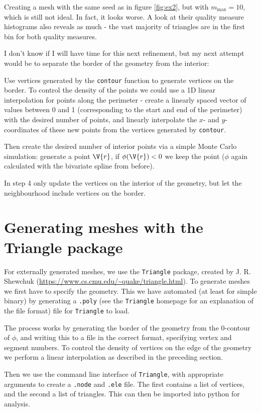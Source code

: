 \documentclass[sigconf]{acmart}
\begin{document}
Creating a mesh with the same seed as in figure \ref{fig:ex2}, but with $ m_{\max} = 10 $, which is still not ideal. In fact, it looks worse. A look at their quality measure histograms also reveals as much - the vast majority of triangles are in the first bin for both quality measures.

I don't know if I will have time for this next refinement, but my next attempt would be to separate the border of the geometry from the interior:

Use vertices generated by the \texttt{contour} function to generate vertices on the border. To control the density of the points we could use a 1D linear interpolation for points along the perimeter - create a linearly spaced vector of values between 0 and 1 (corresponding to the start and end of the perimeter) with the desired number of points, and linearly interpolate the $ x $- and $ y $-coordinates of these new points from the vertices generated by \texttt{contour}.

Then create the desired number of interior points via a simple Monte Carlo simulation: generate a point $ \V{r} $, if $ \phi(\V{r}) < 0 $ we keep the point ($ \phi $ again calculated with the bivariate spline from before).

In step 4 only update the vertices on the interior of the geometry, but let the neighbourhood include vertices on the border.


\section{Generating meshes with the Triangle package}
For externally generated meshes, we use the \texttt{Triangle} package, created by J. R. Shewchuk (\url{https://www.cs.cmu.edu/~quake/triangle.html}). To generate meshes we first have to specify the geometry. This we have automated (at least for simple binary) by generating a \texttt{.poly} (see the \texttt{Triangle} homepage for an explanation of the file format) file for \texttt{Triangle} to load.

The process works by generating the border of the geometry from the 0-contour of $ \phi $, and writing this to a file in the correct format, specifying vertex and segment numbers. To control the density of vertices on the edge of the geometry we perform a linear interpolation as described in the preceding section.

Then we use the command line interface of \texttt{Triangle}, with appropriate arguments to create a \texttt{.node} and \texttt{.ele} file. The first contains a list of vertices, and the second a list of triangles. This can then be imported into python for analysis.
\end{document}
